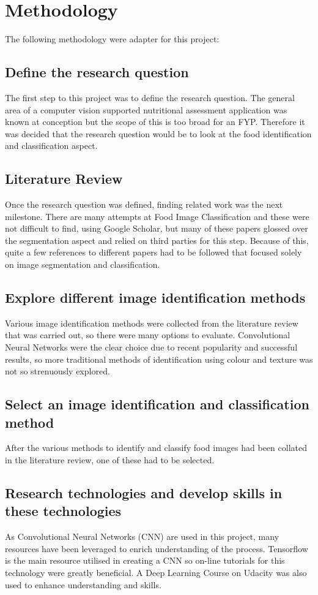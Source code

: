\section{Methodology}
The following methodology were adapter for this project:

\subsection*{Define the research question}
The first step to this project was to define the research question.
The general area of a computer vision supported nutritional assessment application was known at conception but the scope of this is too broad for an FYP.
Therefore it was decided that the research question would be to look at the food identification and classification aspect.

\subsection*{Literature Review}
Once the research question was defined, finding related work was the next milestone.
There are many attempts at Food Image Classification and these were not difficult to find, using Google Scholar, but many of these papers glossed over the segmentation aspect and relied on third parties for this step.
Because of this, quite a few references to different papers had to be followed that focused solely on image segmentation and classification.

\subsection*{Explore different image identification methods}
Various image identification methods were collected from the literature review
that was carried out, so there were many options to evaluate.
Convolutional Neural Networks were the clear choice due to recent popularity and successful results, so more traditional methods of identification using colour and texture was not so strenuously explored.

\subsection*{Select an image identification and classification method}
After the various methods to identify and classify food images had been collated in the literature review, one of these had to be selected.

\subsection*{Research technologies and develop skills in these technologies}
As Convolutional Neural Networks (CNN) are used in this project, many resources have been leveraged to enrich understanding of the process.
Tensorflow is the main resource utilised  in creating a CNN so on-line tutorials for this technology were greatly beneficial.
A Deep Learning Course on Udacity was also used to enhance understanding and skills.

